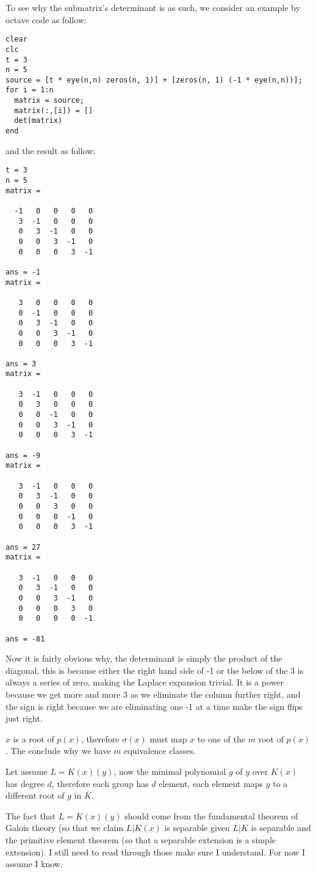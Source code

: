 \documentclass{article}
\begin{document}
To see why the submatrix's determinant is as such, we consider an example by octave code as follow:

\begin{verbatim}
clear
clc
t = 3
n = 5
source = [t * eye(n,n) zeros(n, 1)] + [zeros(n, 1) (-1 * eye(n,n))];
for i = 1:n
  matrix = source;
  matrix(:,[i]) = []
  det(matrix)
end 
\end{verbatim}

and the result as follow:

\begin{verbatim}
t = 3
n = 5
matrix =

  -1   0   0   0   0
   3  -1   0   0   0
   0   3  -1   0   0
   0   0   3  -1   0
   0   0   0   3  -1

ans = -1
matrix =

   3   0   0   0   0
   0  -1   0   0   0
   0   3  -1   0   0
   0   0   3  -1   0
   0   0   0   3  -1

ans = 3
matrix =

   3  -1   0   0   0
   0   3   0   0   0
   0   0  -1   0   0
   0   0   3  -1   0
   0   0   0   3  -1

ans = -9
matrix =

   3  -1   0   0   0
   0   3  -1   0   0
   0   0   3   0   0
   0   0   0  -1   0
   0   0   0   3  -1

ans = 27
matrix =

   3  -1   0   0   0
   0   3  -1   0   0
   0   0   3  -1   0
   0   0   0   3   0
   0   0   0   0  -1

ans = -81
\end{verbatim}

Now it is fairly obvious why, the determinant is simply the product of the diagonal, this is because either the right hand side of -1 or the below of the 3 is always a series of zero, making the Laplace expansion trivial. It is a power because we get more and more 3 as we eliminate the column further right, and the sign is right because we are eliminating one -1 at a time make the sign flips just right.

$ x $ is a root of $ p(x) $, therefore $ \sigma(x) $ must map $ x $ to one of the $ m $ root of $ p(x) $. The conclude why we have $ m $ equivalence classes.

Let assume $ L = K(x)(y) $, now the minimal polynomial $ g $ of $ y $ over $ K(x) $ has degree $ d $, therefore each group has $ d $ element, each element maps $ y $ to a different root of $ g $ in $ \overline{K} $.

The fact that $ L = K(x)(y) $ should come from the fundamental theorem of Galois theory (so that we claim $ L | K(x) $ is separable given $ L | K $ is separable and the primitive element theorem (so that a separable extension is a simple extension). I still need to read through those make sure I understand. For now I assume I know.
\end{document}
